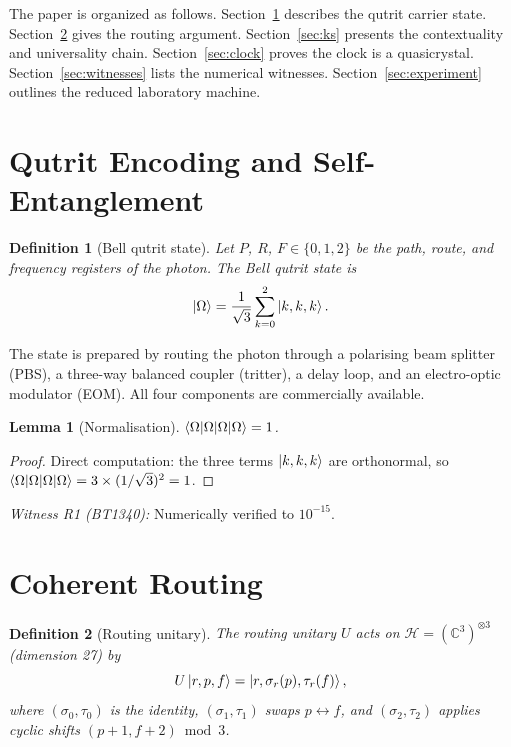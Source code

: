 \documentclass[prl,twocolumn,showpacs,superscriptaddress,longbibliography]{revtex4-2}
\newtheorem{lemma}[theorem]{Lemma}
\newtheorem{definition}{Definition}
\begin{document}
The paper is organized as follows.
Section~\ref{sec:encoding} describes the qutrit carrier state.
Section~\ref{sec:routing} gives the routing argument.
Section~\ref{sec:ks} presents the contextuality and universality
chain.
Section~\ref{sec:clock} proves the clock is a quasicrystal.
Section~\ref{sec:witnesses} lists the numerical witnesses.
Section~\ref{sec:experiment} outlines the reduced laboratory machine.

\section{Qutrit Encoding and Self-Entanglement}\label{sec:encoding}

\begin{definition}[Bell qutrit state]
Let $P$, $R$, $F \in \{0,1,2\}$ be the path, route, and
frequency registers of the photon. The Bell qutrit state is
\begin{equation}
  \ket{\Omega} = \frac{1}{\sqrt{3}}
  \sum_{k=0}^{2}\ket{k,k,k}.
  \label{eq:bell}
\end{equation}
\end{definition}

The state is prepared by routing the photon through a polarising
beam splitter (PBS), a three-way balanced coupler (tritter),
a delay loop, and an electro-optic modulator (EOM).
All four components are commercially available.

\begin{lemma}[Normalisation]
$\braket{\Omega|\Omega} = 1$.
\end{lemma}
\begin{proof}
Direct computation: the three terms $\ket{k,k,k}$ are orthonormal,
so $\braket{\Omega|\Omega} = 3 \times (1/\sqrt{3})^2 = 1$.
\end{proof}

\noindent
\emph{Witness R1 (BT1340):} Numerically verified to $10^{-15}$.

\section{Coherent Routing}\label{sec:routing}

\begin{definition}[Routing unitary]
The routing unitary $U$ acts on
$\mathcal{H} = (\mathbb{C}^3)^{\otimes 3}$ (dimension 27) by
\begin{equation}
  U\ket{r,p,f} = \ket{r,\sigma_r(p),\tau_r(f)},
  \label{eq:routing}
\end{equation}
where $(\sigma_0,\tau_0)$ is the identity,
$(\sigma_1,\tau_1)$ swaps $p\leftrightarrow f$, and
$(\sigma_2,\tau_2)$ applies cyclic shifts $(p+1, f+2)\bmod 3$.
\end{definition}
\end{document}
